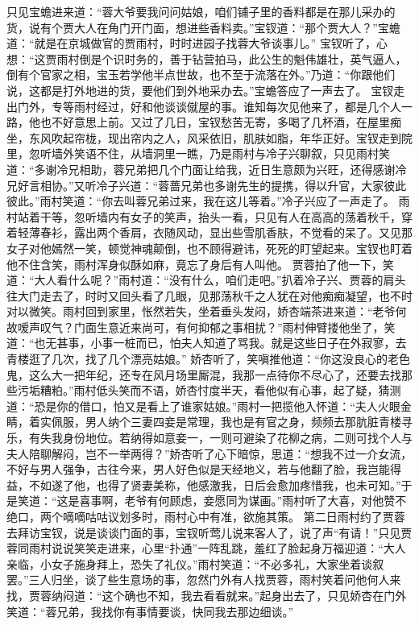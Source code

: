 \documentclass[12pt,oneside]{book}
\begin{document}
只见宝蟾进来道：“蓉大爷要我问问姑娘，咱们铺子里的香料都是在那儿采办的货，说有个贾大人在角门开门面，想进些香料卖。”宝钗道：“那个贾大人？”宝蟾道：“就是在京城做官的贾雨村，时时进园子找蓉大爷谈事儿。”
宝钗听了，心想：“这贾雨村倒是个识时务的，善于钻营拍马，此公生的魁伟雄壮，英气逼人，倒有个官家之相，宝玉若学他半点世故，也不至于流落在外。”乃道：“你跟他们说，这都是打外地进的货，要他们到外地采办去。”宝蟾答应了一声去了。
宝钗走出门外，专等雨村经过，好和他谈谈僦屋的事。谁知每次见他来了，都是几个人一路，他也不好意思上前。又过了几日，宝钗愁苦无寄，多喝了几杯酒，在屋里痴坐，东风吹起帘栊，现出帘内之人，风采依旧，肌肤如脂，年华正好。宝钗走到院里，忽听墙外笑语不住，从墙洞里一瞧，乃是雨村与冷子兴聊叙，只见雨村笑道：“多谢冷兄相助，蓉兄弟把几个门面让给我，近日生意颇为兴旺，还得感谢冷兄好言相协。”又听冷子兴道：“蓉蔷兄弟也多谢先生的提携，得以升官，大家彼此彼此。”雨村笑道：“你去叫蓉兄弟过来，我在这儿等着。”冷子兴应了一声走了。
雨村站着干等，忽听墙内有女子的笑声，抬头一看，只见有人在高高的荡着秋千，穿着轻薄春衫，露出两个香肩，衣随风动，显出些雪肌香肤，不觉看的呆了。又见那女子对他嫣然一笑，顿觉神魂颠倒，也不顾得避讳，死死的盯望起来。宝钗也盯着他不住含笑，雨村浑身似酥如麻，竟忘了身后有人叫他。
贾蓉拍了他一下，笑道：“大人看什么呢？”雨村道：“没有什么，咱们走吧。”扒着冷子兴、贾蓉的肩头往大门走去了，时时又回头看了几眼，见那荡秋千之人犹在对他痴痴凝望，也不时对以微笑。雨村回到家里，怅然若失，坐着垂头发闷，娇杏端茶进来道：“老爷何故嗳声叹气？门面生意近来尚可，有何抑郁之事相扰？”雨村伸臂搂他坐了，笑道：“也无甚事，小事一桩而已，怕夫人知道了骂我。就是这些日子在外寂寥，去青楼逛了几次，找了几个漂亮姑娘。”
娇杏听了，笑嗔推他道：“你这没良心的老色鬼，这么大一把年纪，还专在风月场里厮混，我那一点待你不尽心了，还要去找那些污垢糟粕。”雨村低头笑而不语，娇杏忖度半天，看他似有心事，起了疑，猜测道：“恐是你的借口，怕又是看上了谁家姑娘。”雨村一把揽他入怀道：“夫人火眼金睛，着实佩服，男人纳个三妻四妾是常理，我也是有官之身，频频去那肮脏青楼寻乐，有失我身份地位。若纳得如意妾一，一则可避染了花柳之病，二则可找个人与夫人陪聊解闷，岂不一举两得？”娇杏听了心下暗惊，思道：“想我不过一介女流，不好与男人强争，古往今来，男人好色似是天经地义，若与他翻了脸，我岂能得益，不如遂了他，也得了贤妻美称，他感激我，日后会愈加疼惜我，也未可知。”于是笑道：“这是喜事啊，老爷有何顾虑，妾愿同为谋画。”雨村听了大喜，对他赞不绝口，两个嘀嘀咕咕议划多时，雨村心中有准，欲施其策。
第二日雨村约了贾蓉去拜访宝钗，说是谈谈门面的事，宝钗听莺儿说来客人了，说了声“有请！”只见贾蓉同雨村说说笑笑走进来，心里“扑通”一阵乱跳，羞红了脸起身万福迎道：“大人亲临，小女子施身拜上，恐失了礼仪。”雨村笑道：“不必多礼，大家坐着谈叙罢。”三人归坐，谈了些生意场的事，忽然门外有人找贾蓉，雨村笑着问他何人来找，贾蓉纳闷道：“这个确也不知，我去看看就来。”起身出去了，只见娇杏在门外笑道：“蓉兄弟，我找你有事情要谈，快同我去那边细谈。”
\end{document}
